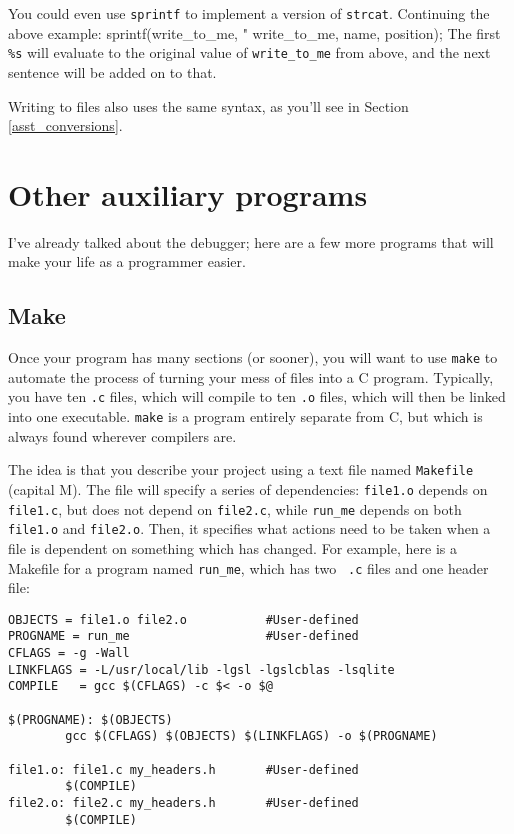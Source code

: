 \documentclass[12pt]{article}
\begin{document}
You could even use {\tt sprintf} to implement a version of {\tt strcat}. Continuing the above example:
sprintf(write_to_me, "%
                          write_to_me, name, position);
The first {\tt \%s} will evaluate to the original value of {\tt write\_to\_me} from above, and the next
sentence will be added on to that.

Writing to files also uses the same syntax, as you'll see in Section \ref{asst_conversions}.

\section{Other auxiliary programs} I've already talked about the debugger; here
are a few more programs that will make your life as a programmer easier.

\subsection{Make} \label{make} 
Once your program has many sections (or sooner), you will want to use
{\tt make} to automate the process of turning your mess of files into
a C program. Typically, you have ten {\tt .c} files, which will compile
to ten {\tt .o} files, which will then be linked into one executable.
 {\tt make} is a program entirely separate from C, but which
is always found wherever compilers are.

The idea is that you describe your project using a
text file named {\tt Makefile} (capital M). The file will specify a
series of dependencies: {\tt file1.o} depends on {\tt file1.c}, but does
not depend on {\tt file2.c}, while {\tt run\_me} depends on both {\tt
file1.o} and {\tt file2.o}.  Then, it specifies what actions need to be taken
when a file is dependent on something which has changed.  For example,
here is a Makefile for a program named {\tt run\_me}, which has two {\tt
.c} files and one header file:

\begin{verbatim}
OBJECTS = file1.o file2.o           #User-defined
PROGNAME = run_me                   #User-defined
CFLAGS = -g -Wall
LINKFLAGS = -L/usr/local/lib -lgsl -lgslcblas -lsqlite
COMPILE   = gcc $(CFLAGS) -c $< -o $@

$(PROGNAME): $(OBJECTS)
        gcc $(CFLAGS) $(OBJECTS) $(LINKFLAGS) -o $(PROGNAME)

file1.o: file1.c my_headers.h       #User-defined
        $(COMPILE)
file2.o: file2.c my_headers.h       #User-defined
        $(COMPILE)
\end{verbatim}
\end{document}

